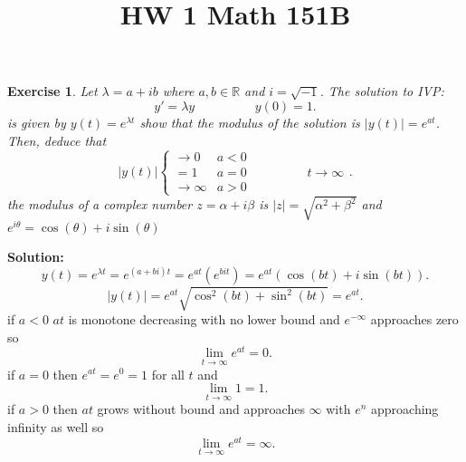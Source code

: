 \documentclass[a4paper,12pt]{scrartcl} %
\newenvironment{solution}
  {\par\color{answercolor}\textbf{Solution:}\ }
  {\par}
\newcounter{customcounter}
\theoremstyle{darktheorem}
\newtheorem{exercise}[customcounter]{Exercise}
\begin{document}
\title{\color{sectioncolor}HW 1 Math 151B}
\author{}
\date{}
\maketitle

\thispagestyle{fancy}

\begin{exercise}
    Let $\lambda = a + ib$ where $a,b \in \mathbb{R}$ and $i = \sqrt{-1}$. The solution to
    IVP:
     \[
         y' = \lambda y \hspace{2cm} y(0) = 1
    .\] 
    is given by $y(t) = e^{\lambda t}$ show that the modulus of the solution is $|y(t)| = e^{at}$. Then, deduce
    that
    \[
    |y(t)|
    \begin{cases}
        \rightarrow 0 & a < 0\\
        = 1 & a = 0  \hspace{2cm} t \rightarrow \infty\\
        \rightarrow \infty & a > 0
    \end{cases}
    .\] 
    the modulus of a complex number $z = \alpha + i \beta$ is $|z| = \sqrt{\alpha^2 + \beta^2}$ and $e^{i\theta} = \cos(\theta) + i\sin(\theta)$
\end{exercise}
\begin{solution}
    \[
    y(t) = e^{\lambda t} = e^{(a + bi)t} = e^{at}(e^{bit}) = e^{at}(\cos(bt) + i\sin(bt))
    .\] 
    \[
    |y(t)| = e^{at}\sqrt{\cos^2(bt) + \sin^2(bt)} = e^{at}
    .\] 
    if $a < 0$ $at$ is monotone decreasing with no lower bound and $e^{-\infty}$ approaches zero so  
    \[
    \lim_{t\to \infty} e^{at} = 0
    .\] 
    if $a = 0$ then $e^{at} = e^{0} = 1$ for all $t$ and
    \[
    \lim_{t\to \infty}1 = 1
    .\] 
    if $a > 0$ then $at$ grows without bound and approaches $\infty$ with $e^{n}$ approaching infinity as well
    so 
    \[
    \lim_{t\to \infty}e^{at} = \infty
    .\] 
\end{solution}
\end{document}
